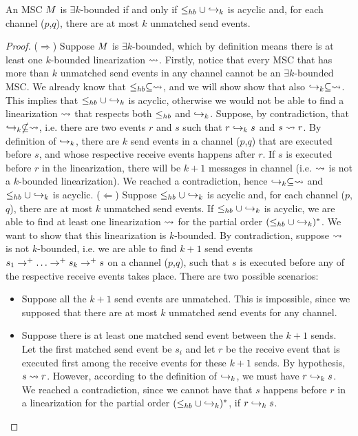 \begin{proposition}\label{prop:asy_ek_def_alt}
	An MSC $M$ is $\exists k$-bounded if and only if $\leq_{hb} \cup \hookrightarrow_{k}$ is acyclic and, for each channel ($p$,$q$), there are at most $k$ unmatched send events.
\end{proposition}
\begin{proof}
	($\Rightarrow$) Suppose $M$ is $\exists k$-bounded, which by definition means there is at least one $k$-bounded linearization $\rightsquigarrow$. Firstly, notice that every MSC that has more than $k$ unmatched send events in any channel cannot be an $\exists k$-bounded MSC. We already know that $\leq_{hb} \subseteq \rightsquigarrow$, and we will show show that also $\hookrightarrow_{k} \subseteq \rightsquigarrow$. This implies that $\leq_{hb} \cup \hookrightarrow_{k}$ is acyclic, otherwise we would not be able to find a linearization $\rightsquigarrow$ that respects both $\leq_{hb}$ and $\hookrightarrow_{k}$. Suppose, by contradiction, that $\hookrightarrow_{k} \nsubseteq \rightsquigarrow$, i.e. there are two events $r$ and $s$ such that $r \hookrightarrow_{k} s$ and $s \rightsquigarrow r$. By definition of $\hookrightarrow_{k}$, there are $k$ send events in a channel ($p$,$q$) that are executed before $s$, and whose respective receive events happens after $r$. If $s$ is executed before $r$ in the linearization, there will be $k+1$ messages in channel (i.e. $\rightsquigarrow$ is not a $k$-bounded linearization). We reached a contradiction, hence $\hookrightarrow_{k} \subseteq \rightsquigarrow$ and $\leq_{hb} \cup \hookrightarrow_{k}$ is acyclic.\newline
	($\Leftarrow$) Suppose $\leq_{hb} \cup \hookrightarrow_{k}$ is acyclic and, for each channel ($p$,$q$), there are at most $k$ unmatched send events. If $\leq_{hb} \cup \hookrightarrow_{k}$ is acyclic, we are able to find at least one linearization $\rightsquigarrow$ for the partial order $(\leq_{hb} \cup \hookrightarrow_{k})^\ast$. We want to show that this linearization is $k$-bounded. By contradiction, suppose $\rightsquigarrow$ is not $k$-bounded, i.e. we are able to find $k+1$ send events $s_1 \procrel^+ \dots \procrel^+ s_k \procrel^+ s$ on a channel ($p$,$q$), such that $s$ is executed before any of the respective receive events takes place. There are two possible scenarios:
	\begin{itemize}\itemsep=0.5ex
		\item Suppose all the $k+1$ send events are unmatched. This is impossible, since we supposed that there are at most $k$ unmatched send events for any channel.
		\item Suppose there is at least one matched send event between the $k+1$ sends. Let the first matched send event be $s_i$ and let $r$ be the receive event that is executed first among the receive events for these $k+1$ sends. By hypothesis, $s \rightsquigarrow r$. However, according to the definition of $\hookrightarrow_{k}$, we must have $r \hookrightarrow_{k} s$. We reached a contradiction, since we cannot have that $s$ happens before $r$ in a linearization for the partial order $(\leq_{hb} \cup \hookrightarrow_{k})^\ast$, if $r \hookrightarrow_{k} s$.
	\end{itemize}
\end{proof}

